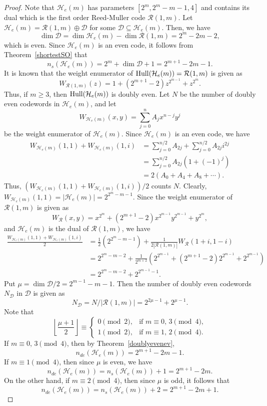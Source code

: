 \documentclass{article}
\theoremstyle{definition}
\theoremstyle{remark}
\begin{document}
\begin{proof}
    Note that $\mathcal{H}_e(m)$ has parameters $[2^m, 2^m-m-1, 4]$ and contains its dual which is the first order Reed-Muller code $\mathcal{R}(1, m)$. Let $\mathcal{H}_e(m)=\mathcal{R}(1, m)\oplus\mathcal{D}$ for some $\mathcal{D}\subseteq \mathcal{H}_e(m)$. Then, we have
    \[
    \dim\mathcal{D}=\dim\mathcal{H}_e(m)-\dim\mathcal{R}(1, m)=2^m-2m-2,
    \]
    which is even. Since $\mathcal{H}_e(m)$ is an even code, it follows from Theorem~\ref{shortestSO} that
    \[
    n_s(\mathcal{H}_e(m))=2^m+\dim\mathcal{D}+1=2^{m+1}-2m-1.
    \]
    It is known that the weight enumerator of ${\rm{Hull}}(\mathcal{H}_e(m))=\mathcal{R}(1, m)$ is given as
    \[
    W_{\mathcal{R}(1, m)}(z)=1+(2^{m+1}-2)z^{2^{m-1}}+z^{2^m}.
    \]
    Thus, if $m\ge 3$, then ${\rm{Hull}}(\mathcal{H}_e(m))$ is doubly even. Let $N$ be the number of doubly even codewords in $\mathcal{H}_e(m)$, and let
    \[
    W_{\mathcal{H}_e(m)}(x, y)=\sum_{j=0}^nA_jx^{n-j}y^j
    \]
    be the weight enumerator of $\mathcal{H}_e(m)$. Since $\mathcal{H}_e(m)$ is an even code, we have 
    \begin{align*}
    W_{\mathcal{H}_e(m)}(1, 1)+W_{\mathcal{H}_e(m)}(1, i)&=\sum_{j=0}^{n/2}A_{2j}+\sum_{j=0}^{n/2}A_{2j}i^{2j}\\&=\sum_{j=0}^{n/2} A_{2j} \left( 1 + (-1)^j \right)\\&=2(A_0+A_4+A_8+\cdots).
    \end{align*}
    Thus, $(W_{\mathcal{H}_e(m)}(1, 1)+W_{\mathcal{H}_e(m)}(1, i))/2$ counts $N$. Clearly, $W_{\mathcal{H}_e(m)}(1, 1)=|\mathcal{H}_e(m)|=2^{2^m-m-1}$. Since the weight enumerator of $\mathcal{R}(1, m)$ is given as
    \[
    W_\mathcal{R}(x, y)=x^{2^m}+(2^{m+1}-2)x^{2^{m-1}}y^{2^{m-1}}+y^{2^m},
    \]
    and $\mathcal{H}_e(m)$ is the dual of $\mathcal{R}(1, m)$, we have
    \begin{align*}
    \frac{W_{\mathcal{H}_e(m)}(1, 1)+W_{\mathcal{H}_e(m)}(1, i)}{2}&=\frac{1}{2}(2^{2^m-m-1})+\frac{1}{2|\mathcal{R}(1, m)|}W_\mathcal{R}(1+i, 1-i)\\&=2^{2^m-m-2}+\frac{1}{2^{m+2}}(2^{2^{m-1}}+(2^{m+1}-2)2^{2^{m-1}}+2^{2^{m-1}})\\&=2^{2^m-m-2}+2^{2^{m-1}-1}.
    \end{align*}
    Put $\mu=\dim\mathcal{D}/2=2^{m-1}-m-1$. Then the number of doubly even codewords $N_\mathcal{D}$ in $\mathcal{D}$ is given as
    \[
    N_\mathcal{D}=N/|\mathcal{R}(1,m)|=2^{2\mu-1}+2^{\mu-1}.
    \]
    Note that
    \[
    \left\lfloor\frac{\mu+1}{2}\right\rfloor\equiv \begin{cases}
        0\pmod 2, & \mbox{if }m\equiv 0,\, 3\pmod 4,\\
        1\pmod 2, & \mbox{if }m\equiv 1,\, 2\pmod 4.
    \end{cases}
    \]
    If $m\equiv 0,\,3\pmod 4$, then by Theorem~\ref{doublyevenev},
    \[
    n_{de}(\mathcal{H}_e(m))=2^{m+1}-2m-1.
    \]
    If $m\equiv 1\pmod 4$, then since $\mu$ is even, we have
    \[
    n_{de}(\mathcal{H}_e(m))=n_s(\mathcal{H}_e(m))+1=2^{m+1}-2m.
    \]
    On the other hand, if $m\equiv 2\pmod 4$, then since $\mu$ is odd, it follows that
    \[
    n_{de}(\mathcal{H}_e(m))=n_s(\mathcal{H}_e(m))+2=2^{m+1}-2m+1.
    \]
\end{proof}
\end{document}
